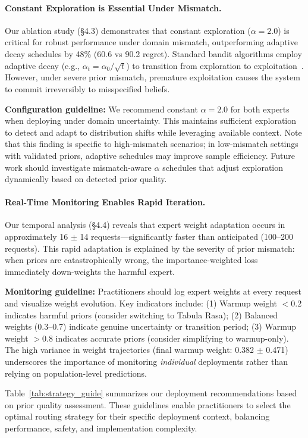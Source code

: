 \paragraph{Constant Exploration is Essential Under Mismatch.}
Our ablation study (§4.3) demonstrates that constant exploration ($\alpha=2.0$) is critical for robust performance under domain mismatch, outperforming adaptive decay schedules by 48\% (60.6 vs 90.2 regret).
Standard bandit algorithms employ adaptive decay (e.g., $\alpha_t = \alpha_0/\sqrt{t}$) to transition from exploration to exploitation~\cite{auer2002ucb}.
However, under severe prior mismatch, premature exploitation causes the system to commit irreversibly to misspecified beliefs.

\textbf{Configuration guideline:}
We recommend constant $\alpha=2.0$ for both experts when deploying under domain uncertainty.
This maintains sufficient exploration to detect and adapt to distribution shifts while leveraging available context.
Note that this finding is specific to high-mismatch scenarios; in low-mismatch settings with validated priors, adaptive schedules may improve sample efficiency.
Future work should investigate mismatch-aware $\alpha$ schedules that adjust exploration dynamically based on detected prior quality.

\paragraph{Real-Time Monitoring Enables Rapid Iteration.}
Our temporal analysis (§4.4) reveals that expert weight adaptation occurs in approximately 16 $\pm$ 14 requests---significantly faster than anticipated (100--200 requests).
This rapid adaptation is explained by the severity of prior mismatch: when priors are catastrophically wrong, the importance-weighted loss immediately down-weights the harmful expert.

\textbf{Monitoring guideline:}
Practitioners should log expert weights at every request and visualize weight evolution.
Key indicators include:
(1) Warmup weight $<$0.2 indicates harmful priors (consider switching to Tabula Rasa);
(2) Balanced weights (0.3--0.7) indicate genuine uncertainty or transition period;
(3) Warmup weight $>$0.8 indicates accurate priors (consider simplifying to warmup-only).
The high variance in weight trajectories (final warmup weight: 0.382 $\pm$ 0.471) underscores the importance of monitoring \emph{individual} deployments rather than relying on population-level predictions.

Table~\ref{tab:strategy_guide} summarizes our deployment recommendations based on prior quality assessment.
These guidelines enable practitioners to select the optimal routing strategy for their specific deployment context, balancing performance, safety, and implementation complexity.
